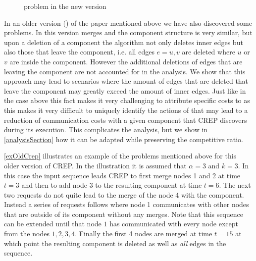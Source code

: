 \documentclass[a4paper,xcolor=dvipsnames, tikz, 12pt]{article}
\newcommand{\crep}{C{\scriptsize REP}}
\newcommand{\opt}{\text{O{\scriptsize PT}}}
\newcommand{\request}[3]{\draw (axis cs:#3,#1) -- node[left]{} (axis cs:#3,#2);}
\theoremstyle{definition}
\begin{document}
	\begin{figure}
		\caption{problem in the new version}\label{exNewCrep}	
	\end{figure}
	
	In an older version (\cite{Avin2015}) of the paper mentioned above we have also discovered some problems. In this version merges and the component structure is very similar, but upon a deletion of a component the algorithm not only deletes inner edges but also those that leave the component, i.e. all edges $e={u,v}$ are deleted where $u$ or $v$ are inside the component. However the additional deletions of edges that are leaving the component are not accounted for in the analysis. We show that this approach may lead to scenarios where the amount of edges that are deleted that leave the component may greatly exceed the amount of inner edges. Just like in the case above this fact makes it very challenging to attribute specific costs to \opt{} as this makes it very difficult to uniquely identify the actions of \opt{} that may lead to a reduction of communication costs with a given component that \crep{} discovers during its execution. This complicates the analysis, but we show in \cref{analysisSection} how it can be adapted while preserving the competitive ratio.
	
	\cref{exOldCrep} illustrates an example of the problems mentioned above for this older version of \crep{}. In the illustration it is assumed that $\alpha=3$ and $k=3$. In this case the input sequence leads \crep{} to first merge nodes 1 and 2 at time $t=3$ and then to add node 3 to the resulting component at time $t= 6$. The next two requests do not quite lead to the merge of the node 4 with the component. Instead a series of requests follows where node 1 communicates with other nodes that are outside of its component without any merges. Note that this sequence can be extended until that node $1$ has communicated with every node except from the nodes $1,2,3,4$. Finally the first 4 nodes are merged at time $t=15$ at which point the resulting component is deleted as well as \textit{all} edges in the sequence. 
\end{document}
